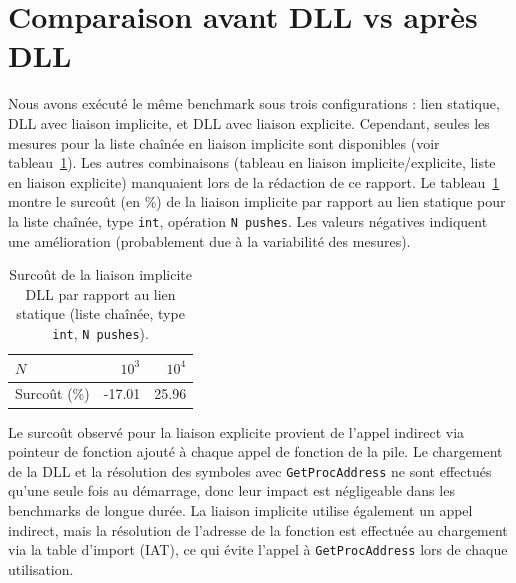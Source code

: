 \documentclass[12pt]{article}
\begin{document}
\section{Comparaison avant DLL vs après DLL}
Nous avons exécuté le même benchmark sous trois configurations :
lien statique, DLL avec liaison implicite, et DLL avec liaison explicite.
Cependant, seules les mesures pour la liste chaînée en liaison implicite sont disponibles (voir tableau~\ref{tab:dll-overhead}).
Les autres combinaisons (tableau en liaison implicite/explicite, liste en liaison explicite) manquaient lors de la rédaction de ce rapport.
Le tableau~\ref{tab:dll-overhead} montre le surcoût (en \%) de la liaison implicite par rapport au lien statique pour la liste chaînée, type \texttt{int}, opération \texttt{N pushes}.
Les valeurs négatives indiquent une amélioration (probablement due à la variabilité des mesures).

\begin{table}[ht]
\centering
\caption{Surcoût de la liaison implicite DLL par rapport au lien statique (liste chaînée, type \texttt{int}, \texttt{N pushes}).}
\begin{tabular}{lrr}
\toprule
\(N\) & \(10^3\) & \(10^4\) \\
\midrule
Surcoût (\%) & -17.01 & 25.96 \\
\bottomrule
\end{tabular}
\label{tab:dll-overhead}
\end{table}

Le surcoût observé pour la liaison explicite provient de l'appel indirect via pointeur de fonction ajouté à chaque appel de fonction de la pile.
Le chargement de la DLL et la résolution des symboles avec \texttt{GetProcAddress} ne sont effectués qu'une seule fois au démarrage,
donc leur impact est négligeable dans les benchmarks de longue durée.
La liaison implicite utilise également un appel indirect, mais la résolution de l'adresse de la fonction est effectuée au chargement
via la table d'import (IAT), ce qui évite l'appel à \texttt{GetProcAddress} lors de chaque utilisation.
\end{document}
